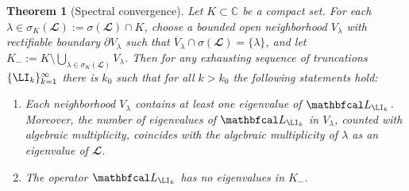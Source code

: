 \documentclass{SciPost}
\newtheorem{theorem}{Theorem}
\begin{document}
\begin{theorem}[Spectral convergence]
Let \(K \subset \mathbb C\) be a compact set. For each \(\lambda \in \sigma_K(\mathbfcal L) := \sigma(\mathbfcal L) \cap K\), choose a bounded open neighborhood \(V_\lambda\) with rectifiable boundary \(\partial V_\lambda\) such that
    $\overline V_\lambda \cap \sigma(\mathbfcal L) = \{\lambda\}$,
and let
    $K_- := K \setminus \bigcup_{\lambda \in \sigma_K(\mathbfcal L)} V_\lambda$.
    Then for any exhausting sequence of truncations $\{\LI_k\}_{k=1}^\infty$ there is $k_0$ such that for all $k > k_0$ the following statements hold:
\begin{enumerate}
    \item
        Each neighborhood \(V_\lambda\) contains at least one eigenvalue of \(\mathbfcal L_{\LI_k}\). Moreover, the number of eigenvalues of \(\mathbfcal L_{\LI_k}\) in \(V_\lambda\), counted with algebraic multiplicity, coincides with the algebraic multiplicity of \(\lambda\) as an eigenvalue of \(\mathbfcal L\).

    \item
        The operator \(\mathbfcal L_{\LI_k}\) has no eigenvalues in \(K_-\).
\end{enumerate}
\label{th:spectrum-convergence}
\end{theorem}
\end{document}
